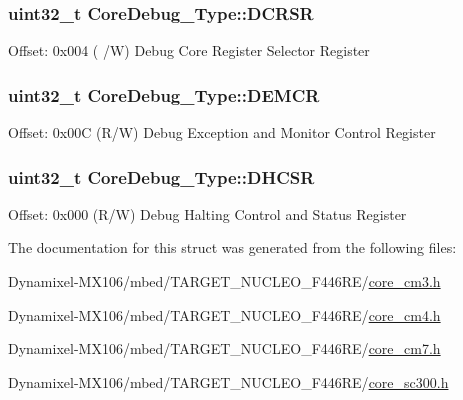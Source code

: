 \subsubsection[{\texorpdfstring{D\+C\+R\+SR}{DCRSR}}]{ uint32\+\_\+t Core\+Debug\+\_\+\+Type\+::\+D\+C\+R\+SR}\hypertarget{struct_core_debug___type_afefa84bce7497652353a1b76d405d983}{}\label{struct_core_debug___type_afefa84bce7497652353a1b76d405d983}
Offset\+: 0x004 ( /W) Debug Core Register Selector Register 
\subsubsection[{\texorpdfstring{D\+E\+M\+CR}{DEMCR}}]{ uint32\+\_\+t Core\+Debug\+\_\+\+Type\+::\+D\+E\+M\+CR}\hypertarget{struct_core_debug___type_a5cdd51dbe3ebb7041880714430edd52d}{}\label{struct_core_debug___type_a5cdd51dbe3ebb7041880714430edd52d}
Offset\+: 0x00C (R/W) Debug Exception and Monitor Control Register 
\subsubsection[{\texorpdfstring{D\+H\+C\+SR}{DHCSR}}]{ uint32\+\_\+t Core\+Debug\+\_\+\+Type\+::\+D\+H\+C\+SR}\hypertarget{struct_core_debug___type_a25c14c022c73a725a1736e903431095d}{}\label{struct_core_debug___type_a25c14c022c73a725a1736e903431095d}
Offset\+: 0x000 (R/W) Debug Halting Control and Status Register 

The documentation for this struct was generated from the following files\+:\begin{DoxyCompactItemize}
\item 
Dynamixel-\/\+M\+X106/mbed/\+T\+A\+R\+G\+E\+T\+\_\+\+N\+U\+C\+L\+E\+O\+\_\+\+F446\+R\+E/\hyperlink{core__cm3_8h}{core\+\_\+cm3.\+h}\item 
Dynamixel-\/\+M\+X106/mbed/\+T\+A\+R\+G\+E\+T\+\_\+\+N\+U\+C\+L\+E\+O\+\_\+\+F446\+R\+E/\hyperlink{core__cm4_8h}{core\+\_\+cm4.\+h}\item 
Dynamixel-\/\+M\+X106/mbed/\+T\+A\+R\+G\+E\+T\+\_\+\+N\+U\+C\+L\+E\+O\+\_\+\+F446\+R\+E/\hyperlink{core__cm7_8h}{core\+\_\+cm7.\+h}\item 
Dynamixel-\/\+M\+X106/mbed/\+T\+A\+R\+G\+E\+T\+\_\+\+N\+U\+C\+L\+E\+O\+\_\+\+F446\+R\+E/\hyperlink{core__sc300_8h}{core\+\_\+sc300.\+h}\end{DoxyCompactItemize}
